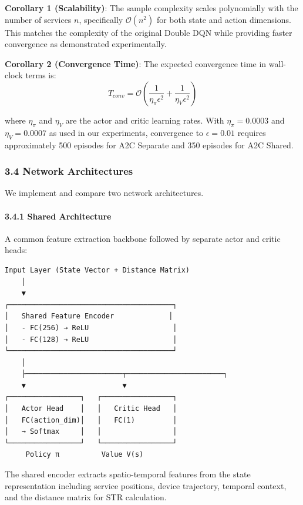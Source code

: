 \documentclass[
  10pt,
  twocolumn,
]{article}
\begin{document}
\textbf{Corollary 1 (Scalability)}: The sample complexity scales
polynomially with the number of services \(n\), specifically
\(\mathcal{O}(n^2)\) for both state and action dimensions. This matches
the complexity of the original Double DQN while providing faster
convergence as demonstrated experimentally.

\textbf{Corollary 2 (Convergence Time)}: The expected convergence time
in wall-clock terms is:
\[T_{conv} = \mathcal{O}\left(\frac{1}{\eta_\pi \epsilon^2} + \frac{1}{\eta_V \epsilon^2}\right)\]

where \(\eta_\pi\) and \(\eta_V\) are the actor and critic learning
rates. With \(\eta_\pi = 0.0003\) and \(\eta_V = 0.0007\) as used in our
experiments, convergence to \(\epsilon = 0.01\) requires approximately
500 episodes for A2C Separate and 350 episodes for A2C Shared.

\hypertarget{network-architectures}{%
	\subsubsection{3.4 Network Architectures}\label{network-architectures}}

We implement and compare two network architectures.

\hypertarget{shared-architecture}{%
	\paragraph{3.4.1 Shared Architecture}\label{shared-architecture}}

A common feature extraction backbone followed by separate actor and
critic heads:

\begin{verbatim}
Input Layer (State Vector + Distance Matrix)
    │
    ▼
┌───────────────────────────────────────┐
│   Shared Feature Encoder             │
│   - FC(256) → ReLU                    │
│   - FC(128) → ReLU                    │
└───────────────────────────────────────┘
    │
    ├───────────────────────┬───────────────────────┐
    ▼                       ▼
┌─────────────────┐   ┌─────────────────┐
│   Actor Head    │   │   Critic Head   │
│   FC(action_dim)│   │   FC(1)         │
│   → Softmax     │   │                 │
└─────────────────┘   └─────────────────┘
     Policy π          Value V(s)
\end{verbatim}

The shared encoder extracts spatio-temporal features from the state
representation including service positions, device trajectory, temporal
context, and the distance matrix for STR calculation.
\end{document}

